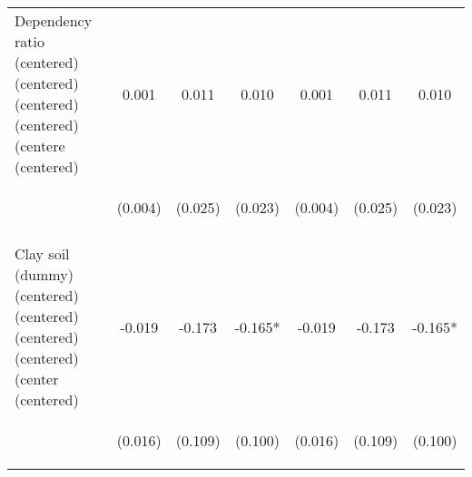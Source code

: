 \begin{center}
\begin{tabular}{lcccccc}
Dependency ratio (centered) (centered) (centered) (centered) (centere (centered) & 0.001 & 0.011 & 0.010 & 0.001 & 0.011 & 0.010 \\
 & \begin{footnotesize}(0.004)\end{footnotesize} & \begin{footnotesize}(0.025)\end{footnotesize} & \begin{footnotesize}(0.023)\end{footnotesize} & \begin{footnotesize}(0.004)\end{footnotesize} & \begin{footnotesize}(0.025)\end{footnotesize} & \begin{footnotesize}(0.023)\end{footnotesize} \\
\vspace{4pt} & \begin{footnotesize}[0.693]\end{footnotesize} & \begin{footnotesize}[0.663]\end{footnotesize} & \begin{footnotesize}[0.657]\end{footnotesize} & \begin{footnotesize}[0.693]\end{footnotesize} & \begin{footnotesize}[0.663]\end{footnotesize} & \begin{footnotesize}[0.657]\end{footnotesize} \\
Clay soil (dummy) (centered) (centered) (centered) (centered) (center (centered) & -0.019 & -0.173 & -0.165* & -0.019 & -0.173 & -0.165* \\
 & \begin{footnotesize}(0.016)\end{footnotesize} & \begin{footnotesize}(0.109)\end{footnotesize} & \begin{footnotesize}(0.100)\end{footnotesize} & \begin{footnotesize}(0.016)\end{footnotesize} & \begin{footnotesize}(0.109)\end{footnotesize} & \begin{footnotesize}(0.100)\end{footnotesize} \\

\end{tabular}
\end{center}
